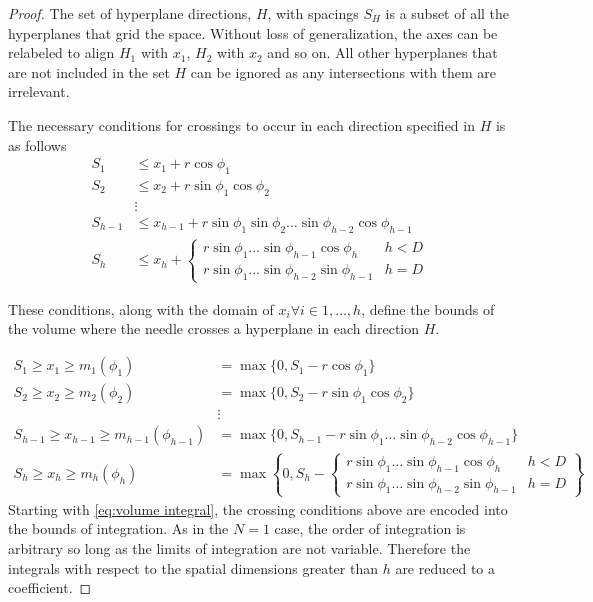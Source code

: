 \documentclass{article}
\begin{document}
\begin{proof}
	The set of hyperplane directions, $H$, with spacings $S_H$ is a subset of all the 
	hyperplanes that grid the space. Without loss of generalization, the axes can be relabeled to
	align $H_1$ with $x_1$, $H_2$ with $x_2$ and so on. All other hyperplanes that are not included
	in the set $H$ can be ignored as any intersections with them are irrelevant.

	The necessary conditions for crossings to occur in each direction specified in $H$ is as follows
	\begin{align}
		S_1 &\le x_1 + r\cos\phi_1\\
		S_2 &\le x_2 + r\sin\phi_1\cos\phi_2\\
		&\vdots \\
		S_{h-1} &\le x_{h-1} + r\sin\phi_1\sin\phi_2\hdots\sin\phi_{h-2}\cos\phi_{h-1}\\
		S_{h} &\le x_h + \begin{cases}
			r\sin\phi_1\hdots\sin\phi_{h-1}\cos\phi_{h} & h < D \\
			r\sin\phi_1\hdots\sin\phi_{h-2}\sin\phi_{h-1} & h = D
		\end{cases}
	\end{align}

	These conditions, along with the domain of $x_i \forall i\in {1,\hdots,h}$, define the bounds of the
	volume where the needle crosses a hyperplane in each direction $H$.
	
	\begin{align}
		S_1 \ge x_1 \ge m_1(\phi_1) &= \max\{0, S_1-r\cos\phi_1\}\\
		S_2 \ge x_2 \ge m_2(\phi_2) &= \max\{0, S_2-r\sin\phi_1\cos\phi_2\}\\
		&\vdots \\
		S_{h-1} \ge x_{h-1} \ge m_{h-1}(\phi_{h-1}) &= \max\{0, S_{h-1}-r\sin\phi_1\hdots\sin\phi_{h-2}\cos\phi_{h-1}\}\\
		S_h \ge x_h \ge m_{h}(\phi_{h}) &= \max\left\{0, S_h - \begin{cases}
			r\sin\phi_1\hdots\sin\phi_{h-1}\cos\phi_{h} & h < D\\
			r\sin\phi_1\hdots\sin\phi_{h-2}\sin\phi_{h-1} & h = D
		\end{cases} \right\}
	\end{align}
	Starting with \ref{eq:volume integral}, the crossing conditions above are encoded into
	the bounds of integration. As in the $N=1$ case, the order of integration is arbitrary
	so long as the limits of integration are not variable. Therefore the integrals with respect to the
	spatial dimensions greater than $h$ are reduced to a coefficient.


\end{proof}
\end{document}
